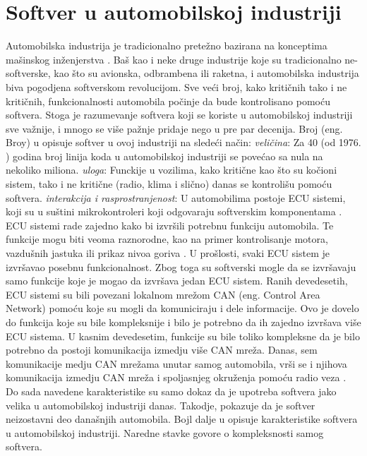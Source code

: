 \documentclass{article}
\begin{document}
\section{Softver u automobilskoj industriji}
Automobilska industrija je tradicionalno pretežno bazirana na konceptima mašinskog inženjerstva \cite{knjiga24}\cite{knjiga25}. Baš kao i neke druge industrije koje su tradicionalno ne-softverske, kao što su avionska, odbrambena ili raketna, i automobilska industrija biva pogodjena softverskom revolucijom. Sve veći broj, kako kritičnih tako i ne kritičnih, funkcionalnosti automobila počinje da bude kontrolisano pomoću softvera. Stoga je razumevanje softvera koji se koriste u automobilskoj industriji sve važnije, i mnogo se više pažnje pridaje nego u pre par decenija. Broj (eng. Broy) u \cite{knjiga25} opisuje softver u ovoj industriji na sledeći način:
\bigbreak
\textit{veličina}: Za 40 (od 1976. \cite{knjiga27}) godina broj linija koda u automobilskoj industriji se povećao sa nula na nekoliko miliona.
\bigbreak
\textit{uloga}: Funckije u vozilima, kako kritične kao što su kočioni sistem, tako i ne kritične (radio, klima i slično) danas se kontrolišu pomoću softvera. 
\bigbreak
\textit{interakcija i rasprostranjenost}: U automobilima postoje ECU sistemi, koji su u suštini mikrokontroleri koji odgovaraju softverskim komponentama \cite{nadji referencu}. ECU sistemi rade zajedno kako bi izvršili potrebnu funkciju automobila. Te funkcije mogu biti veoma raznorodne, kao na primer kontrolisanje motora, vazdušnih jastuka ili prikaz nivoa goriva \cite{knjiga9}. U prošlosti, svaki ECU sistem je izvršavao posebnu funkcionalnost. Zbog toga su softverski mogle da se izvršavaju samo funkcije koje je mogao da izvršava jedan ECU sistem. Ranih devedesetih, ECU sistemi su bili povezani lokalnom mrežom CAN (eng. Control Area Network) pomoću koje su mogli da komuniciraju i dele informacije. Ovo je dovelo do funkcija koje su bile kompleksnije i bilo je potrebno da ih zajedno izvršava više ECU sistema. U kasnim devedesetim, funkcije su bile toliko kompleksne da je bilo potrebno da postoji komunikacija izmedju više CAN mreža. Danas, sem komunikacije medju CAN mrežama unutar samog automobila, vrši se i njihova komunikacija izmedju CAN mreža i spoljasnjeg okruženja pomoću radio veza \cite{knjiga7}.
\bigbreak
Do sada navedene karakteristike su samo dokaz da je upotreba softvera jako velika u automobilskoj industriji danas. Takodje, pokazuje da je softver neizostavni deo današnjih automobila. Bojl dalje u \cite{knjiga27} opisuje karakteristike softvera u automobilskoj industriji. Naredne stavke govore o kompleksnosti samog softvera.
\end{document}
